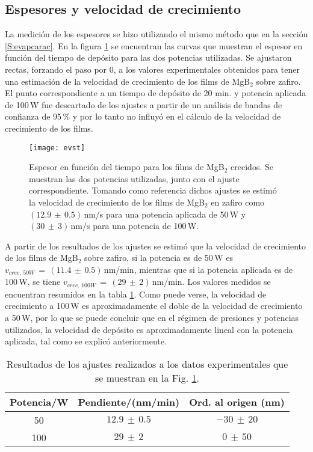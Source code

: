\subsection{Espesores y velocidad de crecimiento}\label{SS:espesor}
La medición de los espesores se hizo utilizando el mismo método que en la sección \ref{S:evapcarac}. En la figura \ref{fig:calibracion} se encuentran las curvas que muestran el espesor en función del tiempo de depósito para las dos potencias utilizadas. Se ajustaron rectas, forzando el paso por 0, a los valores experimentales obtenidos para tener una estimación de la velocidad de crecimiento de los films de MgB$_2$ sobre zafiro. El punto correspondiente a un tiempo de depósito de 20 min. y potencia aplicada de 100\,W fue descartado de los ajustes a partir de un análisis de bandas de confianza de 95\,\% y por lo tanto no influyó en el cálculo de la velocidad de crecimiento de los films.
\begin{figure}[tbh!]
 \begin{center}
    \texttt{[image: evst]}
  \end{center}
\caption[Espesor en función del tiempo para los films de MgB$_2$ crecidos por sputtering.]{Espesor en función del tiempo para los films de MgB$_2$ crecidos. Se muestran las dos potencias utilizadas, junto con el ajuste correspondiente. Tomando como referencia dichos ajustes se estimó la velocidad de crecimiento de los films de MgB$_2$ en zafiro como $(12.9 \, \pm \, 0.5)$\,nm/s para una potencia aplicada de 50\,W y $(30 \, \pm \, 3)$\,nm/s para una potencia de 100\,W.}
\label{fig:calibracion}
\end{figure}

A partir de los resultados de los ajustes se estimó que la velocidad de crecimiento de los films de MgB$_2$ sobre zafiro, si la potencia es de 50\,W es $v_{crec, \, 50W}\, =\, (11.4 \, \pm \, 0.5)$\,nm/min, mientras que si la potencia aplicada es de 100\,W, se tiene $v_{crec,\, 100W}\, =\, (29 \, \pm \, 2)$\,nm/min. Los valores medidos se encuentran resumidos en la tabla \ref{tab:velocidadcrec}. Como puede verse, la velocidad de crecimiento a 100\,W es aproximadamente el doble de la velocidad de crecimiento a 50\,W, por lo que se puede concluir que en el régimen de presiones y potencias utilizados, la velocidad de depósito es aproximadamente lineal con la potencia aplicada, tal como se explicó anteriormente.
\begin{table}[h!]
\centering
\begin{tabular}{|c|c|c|} \hline
Potencia/W & Pendiente/(nm/min) & Ord. al origen (nm)\\ \hline
50 & $12.9\,\pm\,0.5$ & $-30\,\pm\,20$ \\ \hline
100 & $29\,\pm\,2$ & $0\,\pm\,50$ \\ \hline
\end{tabular}
\caption{Resultados de los ajustes realizados a los datos experimentales que se muestran en la Fig. \ref{fig:calibracion}.}
\label{tab:velocidadcrec}
\end{table}
\newpage
